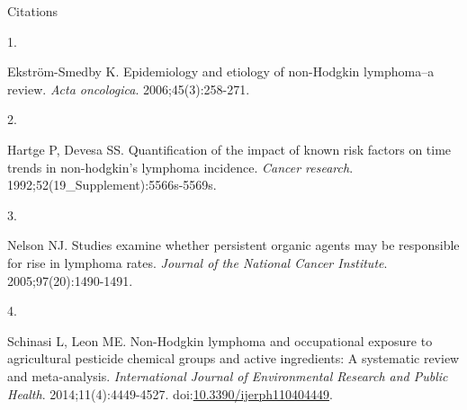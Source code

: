 \documentclass[
  11pt,
  ignorenonframetext,
]{beamer}
\newlength{\cslhangindent}
\newlength{\csllabelwidth}
\newlength{\cslentryspacingunit} %
\newenvironment{CSLReferences}[2] %
 {%
  \setlength{\parindent}{0pt}
  \ifodd #1
  \let\oldpar\par
  \def\par{\hangindent=\cslhangindent\oldpar}
  \fi
  \setlength{\parskip}{#2\cslentryspacingunit}
 }%
 {}
\newcommand{\CSLLeftMargin}[1]{\parbox[t]{\csllabelwidth}{#1}}
\newcommand{\CSLRightInline}[1]{\parbox[t]{\linewidth - \csllabelwidth}{#1}\break}
\begin{document}
\begin{frame}{Citations}
\protect\hypertarget{citations}{}
\singlespacing\footnotesize

\hypertarget{refs}{}
\begin{CSLReferences}{0}{0}
\leavevmode{}%
\CSLLeftMargin{1. }%
\CSLRightInline{Ekström-Smedby K. Epidemiology and etiology of
non-{Hodgkin} lymphoma--a review. \emph{Acta oncologica}.
2006;45(3):258-271.}

\leavevmode{}%
\CSLLeftMargin{2. }%
\CSLRightInline{Hartge P, Devesa SS. Quantification of the impact of
known risk factors on time trends in non-hodgkin's lymphoma incidence.
\emph{Cancer research}. 1992;52(19\_Supplement):5566s-5569s.}

\leavevmode{}%
\CSLLeftMargin{3. }%
\CSLRightInline{Nelson NJ. Studies examine whether persistent organic
agents may be responsible for rise in lymphoma rates. \emph{Journal of
the National Cancer Institute}. 2005;97(20):1490-1491.}

\leavevmode{}%
\CSLLeftMargin{4. }%
\CSLRightInline{Schinasi L, Leon ME. Non-{Hodgkin} lymphoma and
occupational exposure to agricultural pesticide chemical groups and
active ingredients: A systematic review and meta-analysis.
\emph{International Journal of Environmental Research and Public
Health}. 2014;11(4):4449-4527.
doi:\href{https://doi.org/10.3390/ijerph110404449}{10.3390/ijerph110404449}.}

\end{CSLReferences}
\end{frame}
\end{document}
